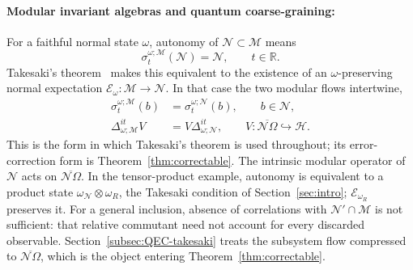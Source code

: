 \documentclass[a4paper,11pt]{article}
\theoremstyle{definition}
\newcommand{\nn}{\nonumber}
\newcommand{\mN}{\mathcal{N}}
\newcommand{\mM}{\mathcal{M}}
\newcommand{\mE}{\mathcal{E}}
\begin{document}
\paragraph{Modular invariant algebras and quantum coarse-graining:}
For a faithful normal state $\omega$, autonomy of $\mN\subset\mM$ means
\begin{equation}\label{eq:quantum-coarse-autonomy}
 \sigma^{\omega;\mM}_t(\mN)=\mN,\qquad t\in\mathbb R.
\end{equation}
Takesaki's theorem~\cite{Takesaki1972} makes this equivalent to the existence of
an $\omega$-preserving normal expectation $\mE_\omega:\mM\to\mN$. In that case the two modular flows intertwine,
\begin{align}
 \sigma^{\omega;\mM}_t(b)&=\sigma^{\omega;\mN}_t(b),\qquad b\in\mN,\nn\\
 \Delta_{\omega;\mM}^{it}V&=V\Delta_{\omega;\mN}^{it},
 \qquad V:\overline{\mN\Omega}\hookrightarrow\mathcal H.
 \label{eq:takesaki-intertwining}
\end{align}
This is the form in which Takesaki's theorem is used throughout; its error-correction form is Theorem~\ref{thm:correctable}.
The intrinsic modular operator of $\mN$ acts on $\overline{\mN\Omega}$.
In the tensor-product example, autonomy is equivalent to a product state
$\omega_{\mN}\otimes\omega_R$, the Takesaki condition of Section~\ref{sec:intro}; $\mE_{\omega_R}$ preserves it.
For a general inclusion, absence of correlations with $\mN'\cap\mM$ is not sufficient:
that relative commutant need not account for every discarded observable.
Section~\ref{subsec:QEC-takesaki} treats the subsystem flow compressed to
$\overline{\mN\Omega}$, which is the object entering Theorem~\ref{thm:correctable}.

\end{document}
